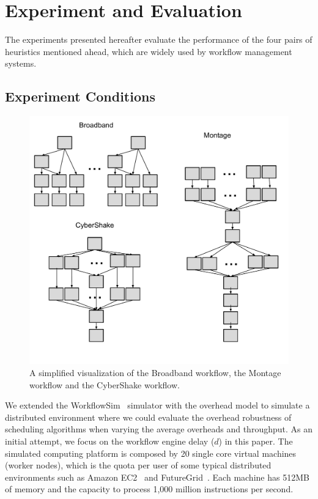 \section{Experiment and Evaluation}


The experiments presented hereafter evaluate the performance of the four pairs of heuristics mentioned ahead, which are widely used by workflow management systems. 

\subsection{Experiment Conditions}


\begin{figure}[htb]
	\centering
	\includegraphics[width=1.0\linewidth]{figure/shape.pdf} 
	\caption{A simplified visualization of the Broadband workflow, the Montage workflow and the CyberShake workflow.}
	\label{fig:shape}
	\vspace{-10pt}
\end{figure}

We extended the WorkflowSim~\cite{WorkflowSim} simulator with the overhead model to simulate a distributed environment where we could evaluate the overhead robustness of scheduling algorithms when varying the average overheads and throughput. As an initial attempt, we focus on the workflow engine delay ($d$) in this paper. The simulated computing platform is composed by 20 single core virtual machines (worker nodes), which is the quota per user of some typical distributed environments such as Amazon EC2~\cite{AmazonAWS} and FutureGrid~\cite{FutureGrid}. Each machine has 512MB of memory and the capacity to process 1,000 million instructions per second. 



